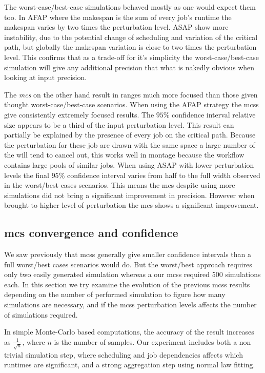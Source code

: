 \documentclass[10pt,conference,compsocconf]{IEEEtran}
\begin{document}
The worst-case/best-case simulations behaved mostly as one would expect
them too. In AFAP where the makespan is the sum of every job's runtime the
makespan varies by two times the perturbation level. ASAP show more instability,
due to the potential change of scheduling and variation of the critical path,
but globally the makespan variation is close to two times the perturbation
level. This confirms that as a trade-off for it's simplicity the
worst-case/best-case simulation will give any additional precision that
what is nakedly obvious when looking at input precision. 

The \emph{\acl{mcs}} on the other hand result in ranges much more focused than
those given thought worst-case/best-case scenarios. When using the AFAP strategy the
\acp{mcs} give consistently extremely focused results. The $95\%$ confidence interval
relative size appears to be a third of the input perturbation level. This result
can partially be explained by the presence of every job on the critical path.
Because the perturbation for these job are drawn with the same space a large
number of the will tend to cancel out, this works well in montage because the
workflow contains large pools of similar jobs. When using ASAP with lower
perturbation levels the final $95\%$ confidence interval varies from half to the
full width observed in the worst/best cases scenarios.
This means the \ac{mcs} despite using more simulations did not bring
a significant improvement in precision. However when brought to higher level of
perturbation the \ac{mcs} shows a significant improvement.

\subsection{\acl{mcs} convergence and confidence}
\label{sec:mcs-convergence}

We saw previously that \aclp{mcs} generally give smaller confidence intervals
than a full worst/best cases scenarios would do. But the worst/best approach requires
only two easily generated simulation whereas a our \acp{mcs} required 500
simulations each. In this section we try examine the evolution of the previous
\acp{mcs} results depending on the number of performed simulation to figure how
many simulations are necessary, and if the \acp{mcs} perturbation levels affects
the number of simulations required.

In simple Monte-Carlo based computations, the accuracy of the result increases
as $\frac{1}{\sqrt{n}}$, where $n$ is the number of samples\cite{Press92}.
Our experiment includes both a non trivial simulation step, where
scheduling and job dependencies affects which runtimes are significant, and a
strong aggregation step using normal law fitting. 
\end{document}
